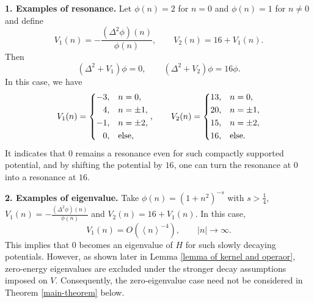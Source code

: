 \documentclass[reqno, 11pt]{amsart}
\numberwithin{equation}{section}
\begin{document}
{\bf{1. Examples of resonance.}} Let $\phi(n)=2$ for $n=0$ and $\phi(n)=1$ for $n\neq0$ and define $$V_1(n)=-\frac{(\Delta^2\phi)(n)}{\phi(n)},\qquad V_2(n)=16+V_1(n).$$ Then
$$(\Delta^2+V_1)\phi=0,\qquad (\Delta^2+V_2)\phi=16\phi.$$
In this case, we have
$$V_1(n)=\left\{\begin{aligned}-3,&\quad n=0,\\4,&\quad n=\pm1,\\-1,&\quad n=\pm2,\\
0,&\quad {\rm else},\end{aligned}\right.,\qquad V_2(n)=\left\{\begin{aligned}13,&\quad n=0,\\20,&\quad n=\pm1,\\15,&\quad n=\pm2,\\
16,&\quad {\rm else}.\end{aligned}\right.$$
It indicates that $0$ remains a resonance even for such compactly supported potential, and by shifting the potential by $16$, one can turn the resonance at $0$ into a resonance at $16$.


{\bf{2. Examples of eigenvalue.}} Take $\phi(n)=(1+n^2)^{-s}$ with $s>\frac{1}{4}$, $V_1(n)=-\frac{(\Delta^2\phi)(n)}{\phi(n)}$ and $V_2(n)=16+V_1(n)$. In this case,
$$V_1(n)=O(\left<n\right>^{-4}),\qquad |n|\rightarrow\infty.$$
This implies that $0$ becomes an eigenvalue of $H$ for such slowly decaying potentials. However, as shown later in Lemma \ref{lemma of kernel and operaor}, zero-energy eigenvalues are excluded under the stronger decay assumptions imposed on $V$. Consequently, the zero-eigenvalue case need not be considered in Theorem \ref{main-theorem} below.
\end{document}
